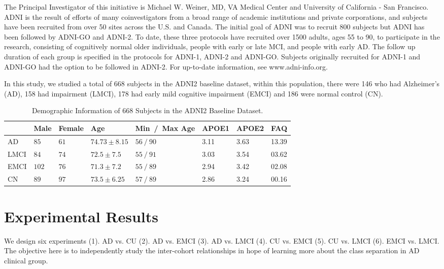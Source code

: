 \documentclass[authoryear,preprint,revi	ew,12pt]{elsarticle}
\newcommand{\Alzheimers} {{Alzheimer\textquoteright s} }
\begin{document}
The Principal Investigator of this initiative is Michael W. Weiner, MD, VA Medical Center and University of California - San Francisco. ADNI is the result of efforts of many coinvestigators from a broad range of academic institutions and private corporations, and subjects have been recruited from over 50 sites across the U.S. and Canada. The initial goal of ADNI was to recruit 800 subjects but ADNI has been followed by ADNI-GO and ADNI-2. To date, these three protocols have recruited over 1500 adults, ages 55 to 90, to participate in the research, consisting of cognitively normal older individuals, people with early or late MCI, and people with early AD. The follow up duration of each group is specified in the protocols for ADNI-1, ADNI-2 and ADNI-GO. Subjects originally recruited for ADNI-1 and ADNI-GO had the option to be followed in ADNI-2. For up-to-date information, see www.adni-info.org.

In this study, we studied a total of 668 subjects in the ADNI2 baseline dataset, within this population, there were 146 who had \Alzheimers (AD), 158 had impairment (LMCI), 178 had early mild cognitive impairment (EMCI) and 186 were normal control (CN).  


\begin{table}[t]
	\begin{center}
		\caption{Demographic Information of $668$ Subjects in the ADNI2 Baseline Dataset.}\label{tab:demographic}
		\begin{tabular}{|P{1.5cm}|P{1cm}P{1cm}P{2.25cm}P{3cm}P{1.25cm}P{1.25cm}P{1.25cm}|}
			\hline
			& Male & Female & Age & Min~/~Max Age & APOE1 & APOE2 & FAQ \\
			\hline\hline
			AD 		& $85$ 	& $61$ & $74.73 \pm 8.15$ 	& $56~/~90$ &	3.11 & 3.63 & 13.39\\
			LMCI 	& $84$ 	& $74$ & $72.5 	\pm 7.5$ 	& $55~/~91$ &	3.03 & 3.54 & 03.62\\
			EMCI 	& $102$ & $76$ & $ 71.3 \pm 7.2 $	& $55~/~89$ &	2.94 & 3.42 & 02.08\\
			CN 		& $89$ 	& $97$ & $ 73.5 \pm 6.25 $ 	& $57~/~89$ &	2.86 & 3.24 & 00.16\\
			\hline
		\end{tabular}
	\end{center}
\end{table}


\section{Experimental Results}
\label{sec:results}
We design six experiments (1). AD vs. CU (2). AD vs. EMCI (3). AD vs. LMCI (4). CU vs. EMCI (5). CU vs. LMCI (6). EMCI vs. LMCI. The objective here is to independently study the inter-cohort relationships in hope of learning more about the class separation in AD clinical group.
\end{document}

